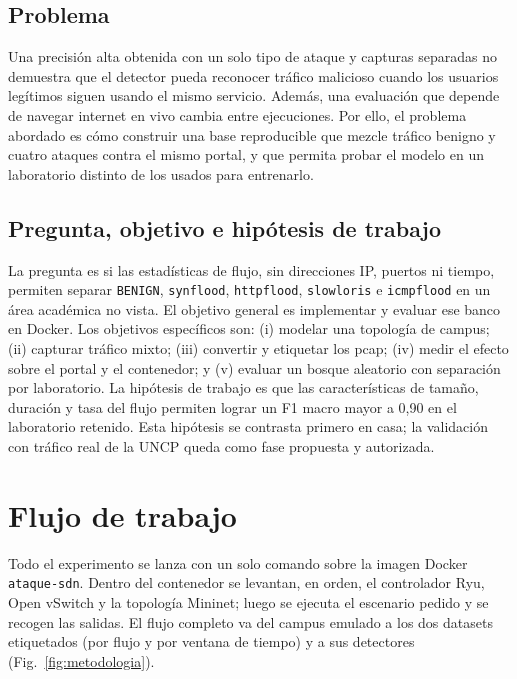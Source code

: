 \documentclass[a4paper,fleqn]{cas-dc}
\begin{document}
\subsection{Problema}
Una precisión alta obtenida con un solo tipo de ataque y capturas separadas no demuestra que el detector pueda reconocer tráfico malicioso cuando los usuarios legítimos siguen usando el mismo servicio. Además, una evaluación que depende de navegar internet en vivo cambia entre ejecuciones. Por ello, el problema abordado es cómo construir una base reproducible que mezcle tráfico benigno y cuatro ataques contra el mismo portal, y que permita probar el modelo en un laboratorio distinto de los usados para entrenarlo.

\subsection{Pregunta, objetivo e hipótesis de trabajo}
La pregunta es si las estadísticas de flujo, sin direcciones IP, puertos ni tiempo, permiten separar \texttt{BENIGN}, \texttt{synflood}, \texttt{httpflood}, \texttt{slowloris} e \texttt{icmpflood} en un área académica no vista. El objetivo general es implementar y evaluar ese banco en Docker. Los objetivos específicos son: (i) modelar una topología de campus; (ii) capturar tráfico mixto; (iii) convertir y etiquetar los pcap; (iv) medir el efecto sobre el portal y el contenedor; y (v) evaluar un bosque aleatorio con separación por laboratorio. La hipótesis de trabajo es que las características de tamaño, duración y tasa del flujo permiten lograr un F1 macro mayor a 0,90 en el laboratorio retenido. Esta hipótesis se contrasta primero en casa; la validación con tráfico real de la UNCP queda como fase propuesta y autorizada.

\section{Flujo de trabajo}\label{sec:workflow}

Todo el experimento se lanza con un solo comando sobre la imagen Docker \texttt{ataque-sdn}. Dentro del contenedor se levantan, en orden, el controlador Ryu, Open vSwitch y la topología Mininet; luego se ejecuta el escenario pedido y se recogen las salidas. El flujo completo va del campus emulado a los dos datasets etiquetados (por flujo y por ventana de
tiempo) y a sus detectores (Fig.~\ref{fig:metodologia}).
\end{document}
